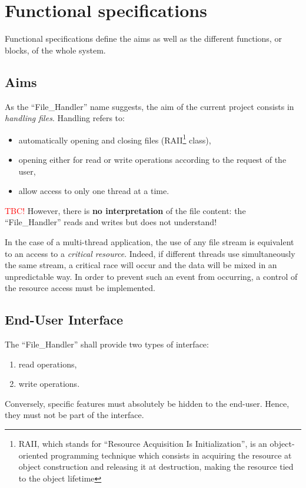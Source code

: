 \chapter{Functional specifications}

Functional specifications define the aims as well as the different functions, or blocks, of the whole system.


\section{Aims}

 	As the \enquote{File\_Handler} name suggests, the aim of the current project consists in \emph{handling files}.
 	Handling refers to:
 	\begin{itemize}
 		\item automatically opening and closing files (RAII\footnote{RAII, which stands for \enquote{Resource Acquisition Is Initialization}, is an object-oriented programming technique which consists in acquiring the resource at object construction and releasing it at destruction, making the resource tied to the object lifetime} class),
 		\item opening either for read or write operations according to the request of the user,
 		\item allow access to only one thread at a time.
 	\end{itemize}
 	\textcolor{red}{TBC!} However, there is \textbf{no interpretation} of the file content: the \enquote{File\_Handler} reads and writes but does not understand!
 
 	In the case of a multi-thread application, the use of any file stream is equivalent to an access to a \emph{critical resource}.
 	Indeed, if different threads use simultaneously the same stream, a critical race will occur and the data will be mixed in an unpredictable way.
 	In order to prevent such an event from occurring, a control of the resource access must be implemented.
 	
 
 
\section{End-User Interface}

	The \enquote{File\_Handler} shall provide two types of interface:
	\begin{enumerate}
		\item read operations,
		\item write operations.
	\end{enumerate}
	Conversely, specific features must absolutely be hidden to the end-user.
	Hence, they must not be part of the interface.
	
